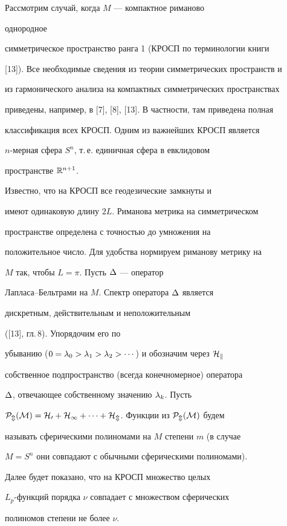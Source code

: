 Рассмотрим случай, когда $M$ --- компактное риманово


однородное


симметрическое пространство ранга 1 (КРОСП по терминологии книги


[13]). Все необходимые сведения из теории симметрических пространств и


из гармонического анализа на компактных симметрических пространствах


приведены, например, в [7], [8], [13]. В частности, там приведена полная


классификация всех КРОСП. Одним из важнейших КРОСП является


$n$-мерная сфера $S^n$, т.\,е. единичная сфера в евклидовом


пространстве $\Bbb R^{n+1}$.


Известно, что на КРОСП все геодезические замкнуты и


имеют одинаковую длину $2L$. Риманова метрика на симметрическом


пространстве определена с точностью до умножения на


положительное число. Для удобства нормируем риманову метрику на


$M$ так, чтобы $L=\pi$. Пусть $\Delta$ --- оператор


Лапласа--Бельтрами на $M$. Спектр оператора $\Delta$ является


дискретным, действительным и неположительным


([13], гл.\,8). Упорядочим его по


убыванию ($0=\lambda_0>\lambda_1>\lambda_2>\dotsb$) и обозначим через $\cal H_k$


собственное подпространство (всегда конечномерное) оператора


$\Delta$, отвечающее собственному значению $\lambda_k$. Пусть


$\cal P_m(M)=\cal H_0+\cal H_1+\dotsb+\cal H_m$. Функции из $\cal P_m(M)$ будем


называть сферическими полиномами на $M$ степени $m$ (в случае


$M=S^n$ они совпадают с обычными сферическими полиномами).


Далее будет показано, что на КРОСП множество целых


$L_p$-функций порядка $\nu$ совпадает с множеством сферических


полиномов степени не более $\nu$.





